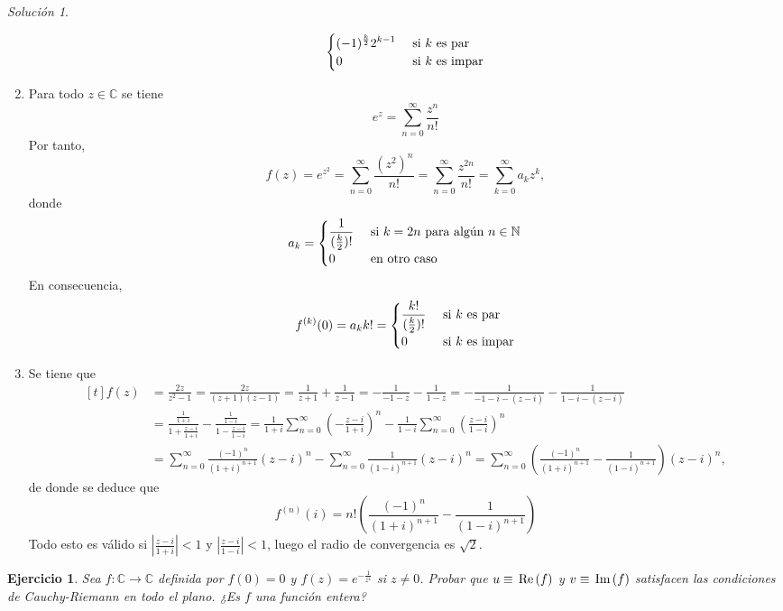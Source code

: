 \documentclass[11pt]{report}
\newcommand{\N}{\mathbb N}
\newcommand{\C}{\mathbb C}
\newcommand{\pars}[1]{\left( #1 \right)} %
\renewcommand{\Re}[1]{\,\textup{Re}\pars{#1}}
\renewcommand{\Im}[1]{\,\textup{Im}\pars{#1}}
\newcommand{\serie}[2][0]{\sum_{n=#1}^\infty #2}
\newtheorem{exercise}{Ejercicio}
\theoremstyle{remark}
\newtheorem*{resolution}{Solución}
\begin{document}
\begin{resolution}
\begin{enumerate}
\[\begin{cases}
        \displaystyle (-1)^{\frac{k}{2}}2^{k-1} & $ si $ k $ es par$ \\
        0 & $ si $ k $ es impar$
    \end{cases}\]
    \item Para todo $z \in \C$ se tiene
    \[e^z = \serie{\frac{z^n}{n!}}\]
    Por tanto,
    \[f(z)=e^{z^2} = \serie{\frac{(z^2)^n}{n!}} = \serie{\frac{z^{2n}}{n!}} = \sum_{k=0}^\infty a_kz^k,\]
    donde 
    \[a_k = \begin{cases}
        \displaystyle \frac{1}{(\frac{k}{2})!} & $ si $ k = 2n $ para algún $ n \in \N \\
        0 & $ en otro caso$
    \end{cases}\]
    En consecuencia,
    \[f^{(k)}(0) = a_kk! = \begin{cases}
        \displaystyle \frac{k!}{(\frac{k}{2})!} & $ si $ k $ es par$ \\
        0 & $ si $ k $ es impar$
    \end{cases}\]
    \item Se tiene que
    \[\begin{aligned}[t]
        f(z)&= \frac{2z}{z^2-1} = \frac{2z}{(z+1)(z-1)} = \frac{1}{z+1}+\frac{1}{z-1} =  -\frac{1}{-1-z}-\frac{1}{1-z} = -\frac{1}{-1-i-(z-i)}-\frac{1}{1-i-(z-i)} \\
        &= \frac{\frac{1}{1+i}}{1+\frac{z-i}{1+i}}-\frac{\frac{1}{1-i}}{1-\frac{z-i}{1-i}} = \frac{1}{1+i}\serie{\left(-\frac{z-i}{1+i}\right)^n}-\frac{1}{1-i}\serie{\left(\frac{z-i}{1-i}\right)^n}\\
        &= \serie{\frac{(-1)^n}{(1+i)^{n+1}}(z-i)^n}-\serie{\frac{1}{(1-i)^{n+1}}(z-i)^n} = \serie{\left(\frac{(-1)^n}{(1+i)^{n+1}}-\frac{1}{(1-i)^{n+1}}\right)(z-i)^n},
    \end{aligned}\]
    de donde se deduce que
    \[f^{(n)}(i) = n!\left(\frac{(-1)^n}{(1+i)^{n+1}}-\frac{1}{(1-i)^{n+1}}\right)\]
    Todo esto es válido si $|\frac{z-i}{1+i}| <1$ y $|\frac{z-i}{1-i}| < 1$, luego el radio de convergencia es $\sqrt{2}$.
\end{enumerate}
\end{resolution}

\begin{exercise}
Sea $f \colon \C \to \C$ definida por $f(0)=0$ y $f(z) = e^{-\frac{1}{z^4}}$ si $z\neq 0$. Probar que $u \equiv \Re{f}$ y $v \equiv \Im{f}$ satisfacen las condiciones de Cauchy-Riemann en todo el plano. ¿Es $f$ una función entera?
\end{exercise}
\end{document}

